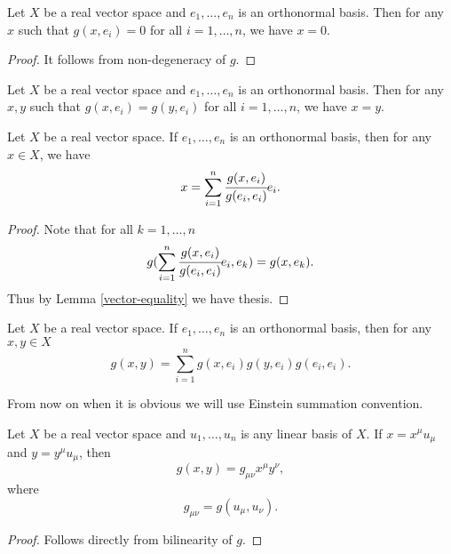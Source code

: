 \documentclass[main.tex]{subfiles}
\begin{document}
\begin{lemma}
Let $X$ be a real vector space and $e_1, \dots, e_n$ is an orthonormal basis. Then for any $x$ such that $g(x, e_i) = 0$ for all $i=1,\dots, n$, we have $x=0$.
\end{lemma}
\begin{proof}
It follows from non-degeneracy of $g$.
\end{proof}
\begin{corollary}
\label{vector-equality}
Let $X$ be a real vector space and $e_1, \dots, e_n$ is an orthonormal basis. Then for any $x,y$ such that $g(x, e_i) = g(y, e_i)$ for all $i=1,\dots, n$, we have $x=y$.
\end{corollary}
\begin{theorem}
Let $X$ be a real vector space. If $e_1, \dots, e_n$ is an orthonormal basis, then for any $x\in X$, we have
\begin{equation}
x = \sum_{i=1}^n \cfrac{g(x,e_i)}{g(e_i, e_i)} e_i.
\end{equation}
\end{theorem}
\begin{proof}
Note that for all $k=1,\dots, n$
\begin{equation}
g(\sum_{i=1}^n \cfrac{g(x, e_i)}{g(e_i, e_i)} e_i, e_k) = g(x, e_k).
\end{equation}
Thus by Lemma \ref{vector-equality} we have thesis.
\end{proof}
\begin{corollary}
Let $X$ be a real vector space. If $e_1, \dots, e_n$ is an orthonormal basis, then for any $x, y\in X$
\begin{equation}
g(x, y) = \sum_{i=1}^n g(x,e_i)g(y,e_i)g(e_i, e_i).
\end{equation}
\end{corollary}

From now on when it is obvious we will use Einstein summation convention.

\begin{theorem}
Let $X$ be a real vector space and $u_1, \dots, u_n$
is any linear basis of $X$. If $x = x^\mu u_\mu$ and $y = y^\mu u_\mu$, then
\begin{equation}
g(x, y) = g_{\mu\nu} x^\mu y^\nu,
\end{equation}
where 
\begin{equation}
g_{\mu \nu} = g(u_\mu, u_\nu).
\end{equation}
\end{theorem}
\begin{proof}
Follows directly from bilinearity of $g$. 
\end{proof}
\end{document}

